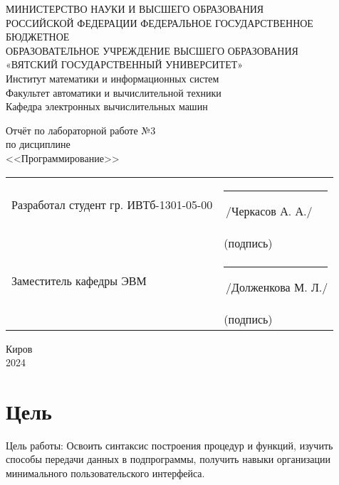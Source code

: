 \documentclass[oneside,a4paper,14pt]{extarticle}
\begin{document}
\newpage
\thispagestyle{empty}
\begin{center}
	МИНИСТЕРСТВО НАУКИ И ВЫСШЕГО ОБРАЗОВАНИЯ\\
	РОССИЙСКОЙ ФЕДЕРАЦИИ
	ФЕДЕРАЛЬНОЕ ГОСУДАРСТВЕННОЕ БЮДЖЕТНОЕ\\
	ОБРАЗОВАТЕЛЬНОЕ
	УЧРЕЖДЕНИЕ ВЫСШЕГО ОБРАЗОВАНИЯ\\
	«ВЯТСКИЙ ГОСУДАРСТВЕННЫЙ УНИВЕРСИТЕТ»\\
	Институт математики и информационных систем\\
	Факультет автоматики и вычислительной техники\\
	Кафедра электронных вычислительных машин
\end{center}
\vspace{20mm}

\begin{center}
	Отчёт по лабораторной работе №3\\
	по дисциплине\\
	<<Программирование>>\\
\end{center}
\vspace{40mm}
\noindent
\begin{tabular}{ll}
	Разработал студент гр. ИВТб-1301-05-00 & \rule[-1mm]{30mm}{0.10mm}\,/Черкасов А. А./   \\
	                                       & \hspace{8mm}\footnotesize(подпись)            \\

	Заместитель кафедры ЭВМ                & \rule[-1mm]{30mm}{0.10mm}\,/Долженкова М. Л./ \\
	                                       & \hspace{8mm}\footnotesize(подпись)            \\
\end{tabular}

\vfill
\begin{center}
	Киров\\
	2024
\end{center}

\newpage\thispagestyle{plain}

\section*{Цель}

\sloppy Цель работы: Освоить синтаксис построения процедур и функций, изучить способы передачи данных в подпрограммы, получить навыки организации минимального пользовательского интерфейса.
\end{document}
